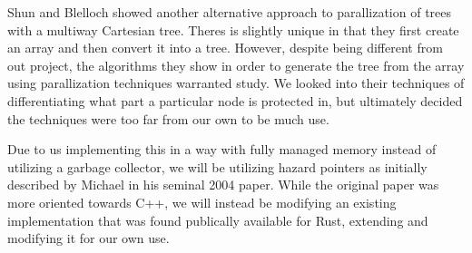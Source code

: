 \documentclass[conference]{IEEEtran}
\begin{document}
\par
Shun and Blelloch showed another alternative approach to parallization of trees with a multiway Cartesian tree. Theres is slightly unique in that they first create an array and then convert it into a tree. However, despite being different from out project, the algorithms they show in order to generate the tree from the array using parallization techniques warranted study. We looked into their techniques of differentiating what part a particular node is protected in, but ultimately decided the techniques were too far from our own to be much use. \cite{Shun2014}
\par
Due to us implementing this in a way with fully managed memory instead of utilizing a garbage collector, we will be utilizing hazard pointers as initially described by Michael in his seminal 2004 paper. \cite{Michael2004} While the original paper was more oriented towards C++, we will instead be modifying an existing implementation that was found publically available for Rust, extending and modifying it for our own use. \cite{CHAMT}
\end{document}
